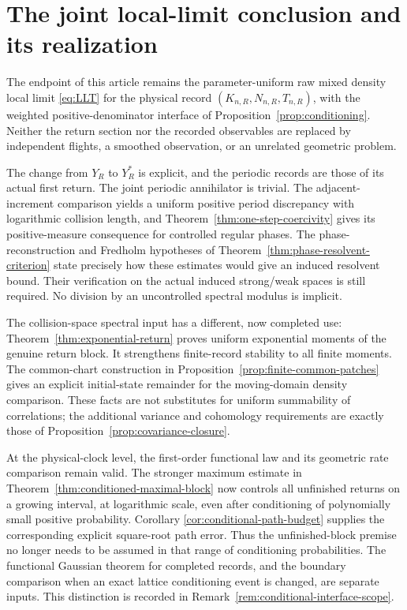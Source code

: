 \section{The joint local-limit conclusion and its realization}
\label{sec:final-realization}
The endpoint of this article remains the parameter-uniform raw mixed
density local limit \eqref{eq:LLT} for the physical record
$(K_{n,R},N_{n,R},T_{n,R})$, with the weighted positive-denominator
interface of Proposition~\ref{prop:conditioning}. Neither the return
section nor the recorded observables are replaced by independent flights,
a smoothed observation, or an unrelated geometric problem.

The change from $Y_R$ to $Y_R^*$ is explicit, and the periodic records
are those of its actual first return. The joint periodic annihilator is
trivial. The adjacent-increment comparison yields a uniform positive
period discrepancy with logarithmic collision length, and
Theorem~\ref{thm:one-step-coercivity} gives its positive-measure
consequence for controlled regular phases. The phase-reconstruction and
Fredholm hypotheses of Theorem~\ref{thm:phase-resolvent-criterion} state
precisely how these estimates would give an induced resolvent bound.
Their verification on the actual induced strong/weak spaces is still
required. No division by an uncontrolled spectral modulus is implicit.

The collision-space spectral input has a different, now completed use:
Theorem~\ref{thm:exponential-return} proves uniform exponential moments
of the genuine return block. It strengthens finite-record stability to
all finite moments. The common-chart construction in
Proposition~\ref{prop:finite-common-patches} gives an explicit
initial-state remainder for the moving-domain density comparison.
These facts are not substitutes for uniform summability of correlations;
the additional variance and cohomology requirements are exactly those
of Proposition~\ref{prop:covariance-closure}.

At the physical-clock level, the first-order functional law and its
geometric rate comparison remain valid. The stronger maximum estimate
in Theorem~\ref{thm:conditioned-maximal-block} now controls all unfinished
returns on a growing interval, at logarithmic scale, even after
conditioning of polynomially small positive probability. Corollary
\ref{cor:conditional-path-budget} supplies the corresponding explicit
square-root path error. Thus the unfinished-block premise no longer
needs to be assumed in that range of conditioning probabilities.
The functional Gaussian theorem for completed records, and the boundary
comparison when an exact lattice conditioning event is changed, are
separate inputs. This distinction is recorded in
Remark~\ref{rem:conditional-interface-scope}.

